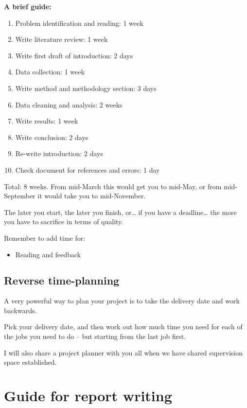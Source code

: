 \documentclass[
]{book}
\providecommand{\tightlist}{%
  \setlength{\itemsep}{0pt}\setlength{\parskip}{0pt}}
\begin{document}
\textbf{A brief guide:}

\begin{enumerate}
\def\labelenumi{\arabic{enumi}.}
\item
  Problem identification and reading: 1 week
\item
  Write literature review: 1 week
\item
  Write first draft of introduction: 2 days
\item
  Data collection: 1 week
\item
  Write method and methodology section: 3 days
\item
  Data cleaning and analysis: 2 weeks
\item
  Write results: 1 week
\item
  Write conclusion: 2 days
\item
  Re-write introduction: 2 days
\item
  Check document for references and errors: 1 day
\end{enumerate}

Total: 8 weeks. From mid-March this would get you to mid-May, or from
mid-September it would take you to mid-November.

The later you start, the later you finish, or\ldots{} if you have a
deadline\ldots{} the more you have to sacrifice in terms of quality.

Remember to add time for:

\begin{itemize}
\tightlist
\item
  Reading and feedback
\end{itemize}

\hypertarget{reverse-time-planning}{%
\section{Reverse time-planning}\label{reverse-time-planning}}

A very powerful way to plan your project is to take the delivery date
and work backwards.

Pick your delivery date, and then work out how much time you need for
each of the jobs you need to do -- but starting from the last job first.

I will also share a project planner with you all when we have shared
supervision space established.

\hypertarget{guide-for-report-writing}{%
\chapter{Guide for report writing}\label{guide-for-report-writing}}
\end{document}
